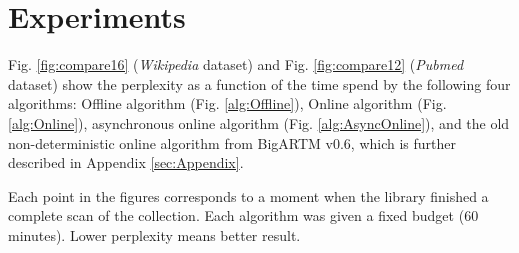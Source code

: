 \documentclass[russian,english]{llncs}
\newcommand{\kw}[1]{\textsf{#1}}
\begin{document}
\section{Experiments}
\label{sec:Experiments}

Fig. \ref{fig:compare16} (\emph{Wikipedia} dataset) and Fig. \ref{fig:compare12} (\emph{Pubmed} dataset)
show the perplexity as a function of the time spend by the following four algorithms:
\kw{Offline algorithm} (Fig. \ref{alg:Offline}),
\kw{Online algorithm} (Fig. \ref{alg:Online}),
asynchronous online algorithm (Fig. \ref{alg:AsyncOnline}),
and the old non-deterministic online algorithm from \kw{BigARTM v0.6}, which is further described in Appendix \ref{sec:Appendix}.

Each point in the figures corresponds to a moment when the library finished a complete scan of the collection.
Each algorithm was given a fixed budget (60 minutes).
Lower perplexity means better result.
\end{document}
